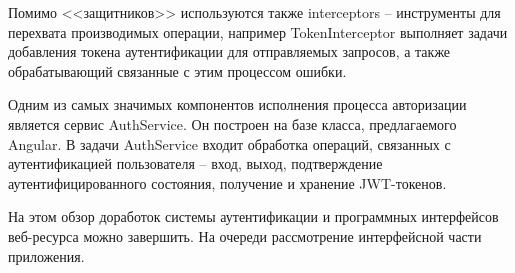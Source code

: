 Помимо <<защитников>> используются также interceptors -- инструменты для перехвата производимых операции, например TokenInterceptor выполняет задачи добавления токена аутентификации для отправляемых запросов, а также обрабатывающий связанные с этим процессом ошибки.

Одним из самых значимых компонентов исполнения процесса авторизации является сервис AuthService.
Он построен на базе класса, предлагаемого Angular.
В задачи AuthService входит обработка операций, связанных с аутентификацией пользователя -- вход, выход, подтверждение аутентифицированного состояния, получение и хранение JWT-токенов.

На этом обзор доработок системы аутентификации и программных интерфейсов веб-ресурса можно завершить.
На очереди рассмотрение интерфейсной части приложения.
\clearpage
